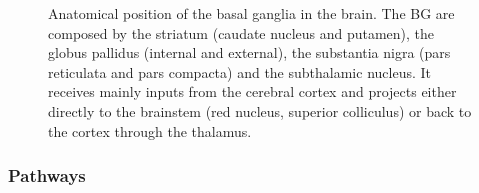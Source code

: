 \documentclass[
  11pt,
  a4paper,
]{scrbook}
\begin{document}
\begin{figure}


\caption{\label{fig-intro:bg_anatomy}Anatomical position of the basal
ganglia in the brain. The BG are composed by the striatum (caudate
nucleus and putamen), the globus pallidus (internal and external), the
substantia nigra (pars reticulata and pars compacta) and the subthalamic
nucleus. It receives mainly inputs from the cerebral cortex and projects
either directly to the brainstem (red nucleus, superior colliculus) or
back to the cortex through the thalamus.}

\end{figure}%

\subsubsection*{Pathways}\label{pathways}
\end{document}
